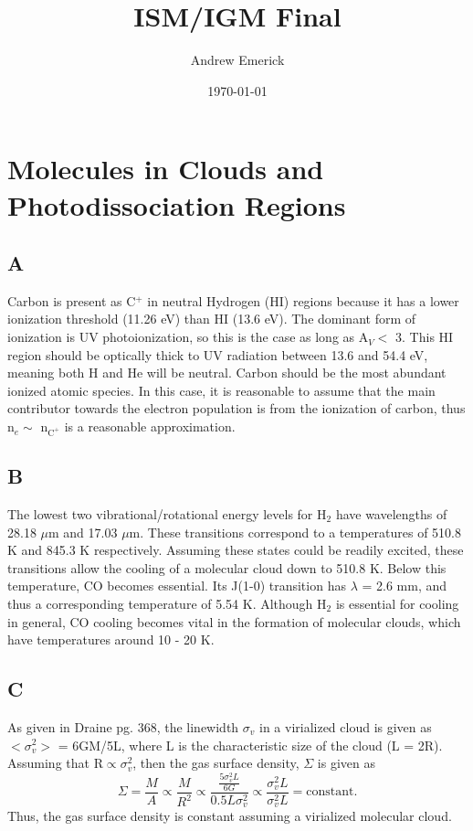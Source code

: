 \documentclass[a4paper]{article}
\date{\today}
\title{ISM/IGM Final}
\author{Andrew Emerick}
\begin{document}
\maketitle
\section{Molecules in Clouds and Photodissociation Regions}

\subsection{A}
Carbon is present as C$^{+}$ in neutral Hydrogen (HI) regions because it has a lower
ionization threshold (11.26 eV) than HI (13.6 eV). The dominant form of ionization
is UV photoionization, so this is the case as long as A$_{V} <$ 3.
This HI region should be optically
thick to UV radiation between 13.6 and 54.4 eV, meaning both H and He will be
neutral. Carbon should be the most abundant ionized atomic species. In this case,
it is reasonable to assume that the main contributor towards the electron
population is from the ionization of carbon, thus n$_{e} \sim$ n$_{\text{C}^+}$ 
is a reasonable approximation.


\subsection{B}
The lowest two vibrational/rotational energy levels for H$_{2}$ have wavelengths of 
28.18 $\mu$m and 17.03 $\mu$m. These transitions correspond to a temperatures
of 510.8 K and 845.3 K respectively. Assuming these states could be readily 
excited, these transitions allow the cooling of a molecular cloud down to
510.8 K. Below this temperature, CO becomes essential. Its J(1-0) transition
has $\lambda$ = 2.6 mm, and thus a corresponding temperature of 5.54 K. Although
H$_{2}$ is essential for cooling in general, CO cooling becomes vital in 
the formation of molecular clouds, which have temperatures around 10 - 20 K.

\subsection{C}
As given in Draine pg. 368, the linewidth $\sigma_v$ in a virialized cloud
is given as $<\sigma_v^2>$ = 6GM/5L, where L is the characteristic size
of the cloud (L = 2R). Assuming that R$\propto \sigma_v^2$, then the
gas surface density, $\Sigma$ is given as
\begin{equation}
\Sigma = \frac{M}{A} \propto \frac{M}{R^2} \propto \frac{\frac{5\sigma_v^2L}{6G}}{0.5L\sigma_v^{2}} \propto \frac{\sigma_v^2L}{\sigma_v^2L} = \text{constant}.
\end{equation}
Thus, the gas surface density is constant assuming a virialized molecular cloud.
\end{document}
